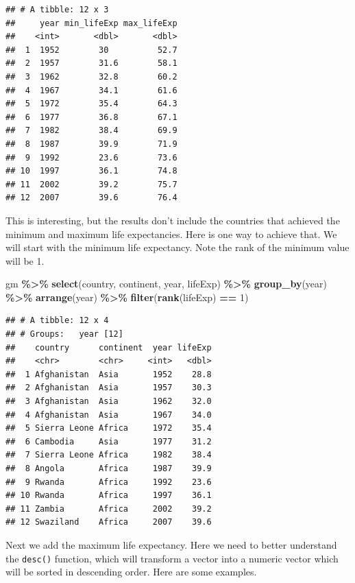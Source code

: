 \documentclass[
]{krantz}
\newenvironment{Shaded}{\begin{snugshade}}{\end{snugshade}}
\newcommand{\DecValTok}[1]{\textcolor[rgb]{0.00,0.00,0.81}{#1}}
\newcommand{\KeywordTok}[1]{\textcolor[rgb]{0.13,0.29,0.53}{\textbf{#1}}}
\newcommand{\NormalTok}[1]{#1}
\newcommand{\OperatorTok}[1]{\textcolor[rgb]{0.81,0.36,0.00}{\textbf{#1}}}
\newcommand{\StringTok}[1]{\textcolor[rgb]{0.31,0.60,0.02}{#1}}
\begin{document}
\begin{verbatim}
## # A tibble: 12 x 3
##     year min_lifeExp max_lifeExp
##    <int>       <dbl>       <dbl>
##  1  1952        30          52.7
##  2  1957        31.6        58.1
##  3  1962        32.8        60.2
##  4  1967        34.1        61.6
##  5  1972        35.4        64.3
##  6  1977        36.8        67.1
##  7  1982        38.4        69.9
##  8  1987        39.9        71.9
##  9  1992        23.6        73.6
## 10  1997        36.1        74.8
## 11  2002        39.2        75.7
## 12  2007        39.6        76.4
\end{verbatim}

This is interesting, but the results don't include the countries that achieved the minimum and maximum life expectancies. Here is one way to achieve that. We will start with the minimum life expectancy. Note the rank of the minimum value will be 1.

\begin{Shaded}
\begin{Highlighting}[]
\NormalTok{gm }\OperatorTok{\%\textgreater{}\%}\StringTok{ }
\StringTok{  }\KeywordTok{select}\NormalTok{(country, continent, year, lifeExp) }\OperatorTok{\%\textgreater{}\%}\StringTok{ }
\StringTok{  }\KeywordTok{group\_by}\NormalTok{(year) }\OperatorTok{\%\textgreater{}\%}\StringTok{ }
\StringTok{  }\KeywordTok{arrange}\NormalTok{(year) }\OperatorTok{\%\textgreater{}\%}\StringTok{ }
\StringTok{  }\KeywordTok{filter}\NormalTok{(}\KeywordTok{rank}\NormalTok{(lifeExp) }\OperatorTok{==}\StringTok{ }\DecValTok{1}\NormalTok{)}
\end{Highlighting}
\end{Shaded}

\begin{verbatim}
## # A tibble: 12 x 4
## # Groups:   year [12]
##    country      continent  year lifeExp
##    <chr>        <chr>     <int>   <dbl>
##  1 Afghanistan  Asia       1952    28.8
##  2 Afghanistan  Asia       1957    30.3
##  3 Afghanistan  Asia       1962    32.0
##  4 Afghanistan  Asia       1967    34.0
##  5 Sierra Leone Africa     1972    35.4
##  6 Cambodia     Asia       1977    31.2
##  7 Sierra Leone Africa     1982    38.4
##  8 Angola       Africa     1987    39.9
##  9 Rwanda       Africa     1992    23.6
## 10 Rwanda       Africa     1997    36.1
## 11 Zambia       Africa     2002    39.2
## 12 Swaziland    Africa     2007    39.6
\end{verbatim}

Next we add the maximum life expectancy. Here we need to better understand the \texttt{desc()} function, which will transform a vector into a numeric vector which will be sorted in descending order. Here are some examples.
\end{document}
